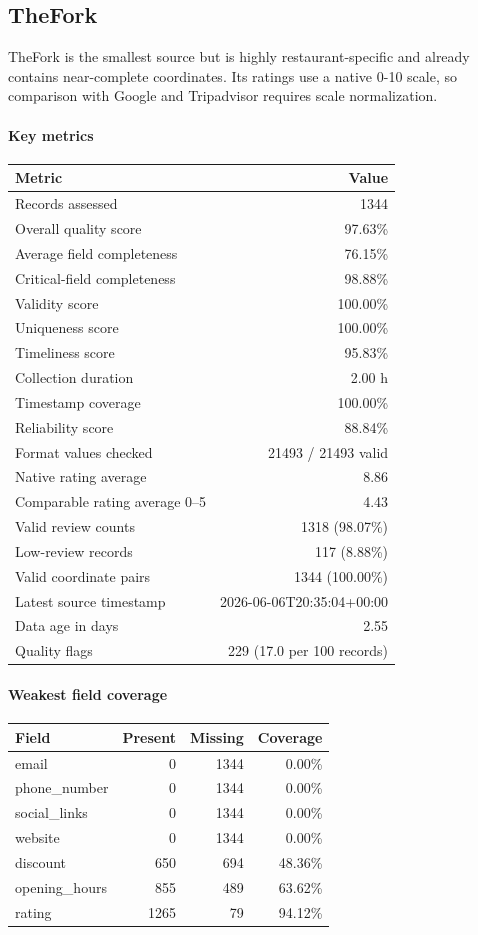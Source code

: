 \subsection{TheFork}

TheFork is the smallest source but is highly restaurant-specific and already contains near-complete coordinates. Its ratings use a native 0-10 scale, so comparison with Google and Tripadvisor requires scale normalization.

\paragraph{Key metrics}
\begin{tabular}{lr}
\toprule
Metric & Value \\
\midrule
Records assessed & 1344 \\
Overall quality score & 97.63\% \\
Average field completeness & 76.15\% \\
Critical-field completeness & 98.88\% \\
Validity score & 100.00\% \\
Uniqueness score & 100.00\% \\
Timeliness score & 95.83\% \\
Collection duration & 2.00 h \\
Timestamp coverage & 100.00\% \\
Reliability score & 88.84\% \\
Format values checked & 21493 / 21493 valid \\
Native rating average & 8.86 \\
Comparable rating average 0--5 & 4.43 \\
Valid review counts & 1318 (98.07\%) \\
Low-review records & 117 (8.88\%) \\
Valid coordinate pairs & 1344 (100.00\%) \\
Latest source timestamp & 2026-06-06T20:35:04+00:00 \\
Data age in days & 2.55 \\
Quality flags & 229 (17.0 per 100 records) \\
\bottomrule
\end{tabular}

\paragraph{Weakest field coverage}
\begin{tabular}{lrrr}
\toprule
Field & Present & Missing & Coverage \\
\midrule
email & 0 & 1344 & 0.00\% \\
phone\_number & 0 & 1344 & 0.00\% \\
social\_links & 0 & 1344 & 0.00\% \\
website & 0 & 1344 & 0.00\% \\
discount & 650 & 694 & 48.36\% \\
opening\_hours & 855 & 489 & 63.62\% \\
rating & 1265 & 79 & 94.12\% \\
\bottomrule
\end{tabular}

